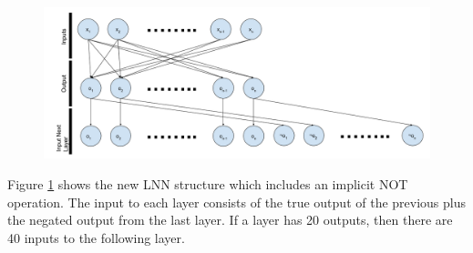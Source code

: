\begin{figure}[H]
	\centering
	\begin{minipage}[b]{0.9\textwidth}
		\includegraphics[width=\textwidth]{Modified-LNN-Structure.png}
		\caption{}
		\label{fig:modified-lnn-structure}
	\end{minipage}
	\hfill
\end{figure}

Figure \ref{fig:modified-lnn-structure} shows the new LNN structure which includes an implicit NOT operation. The input to each layer consists of the true output of the previous plus the negated output from the last layer. If a layer has 20 outputs, then there are 40 inputs to the following layer.
